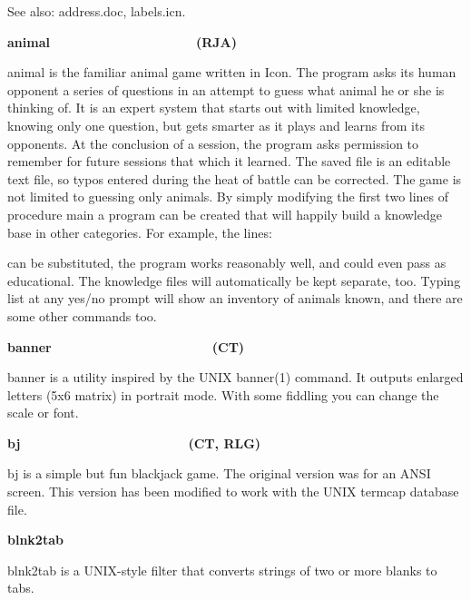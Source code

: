{See also: address.doc, labels.icn.

{\sffamily\bfseries
animal\ \ \ \ \ \ \ \ \ \ \ \ \ \ \ \ \ \ \ \ (RJA)}

\textsf{animal} is the familiar {\textquotedbl}animal
game{\textquotedbl} written in Icon. The program asks its human
opponent a series of questions in an attempt to guess what animal he or
she is thinking of. It is an {\textquotedbl}expert
system{\textquotedbl} that starts out with limited knowledge, knowing
only one question, but gets smarter as it plays and learns from its
opponents. At the conclusion of a session, the program asks permission
to remember for future sessions that which it learned. The saved file
is an editable text file, so typos entered during the heat of battle
can be corrected. The game is not limited to guessing only animals. By
simply modifying the first two lines of procedure
{\textquotedbl}main{\textquotedbl} a program can be created that will
happily build a knowledge base in other categories. For example, the
lines:


can be substituted, the program works reasonably well, and could even
pass as educational. The knowledge files will automatically be kept
separate, too. Typing {\textquotedbl}list{\textquotedbl} at any yes/no
prompt will show an inventory of animals known, and there are some
other commands too. 

{\sffamily\bfseries
banner\ \ \ \ \ \ \ \ \ \ \ \ \ \ \ \ \ \ \ \  \ \ (CT)}

\textsf{banner} is a utility inspired by the UNIX \textsf{banner(1)}
command. It outputs enlarged letters (5x6 matrix) in portrait mode.
With some fiddling you can change the scale or font. 

{\sffamily\bfseries
bj\ \ \ \ \ \ \ \ \ \ \ \ \ \ \ \ \ \ \ \  \ \ \ (CT, RLG)}

\textsf{bj} is a simple but fun blackjack game. The original version was
for an ANSI screen. This version has been modified to work with the
UNIX termcap database file.

{\sffamily\bfseries
blnk2tab\ \ \ \ \ \ \ \ \ \ \ \ \ \ \ \ \ \ \ \ }

\textsf{blnk2tab} is a UNIX-style filter that converts strings of two or
more blanks to tabs.

}
